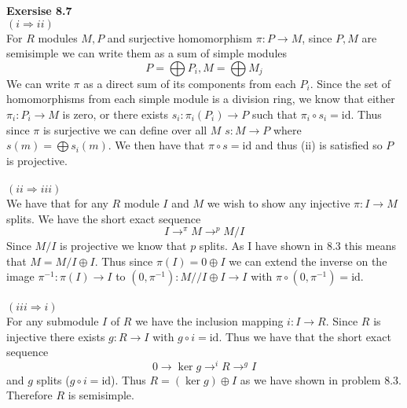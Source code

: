 \documentclass[12pt]{article}
\newenvironment{ques}[1]{\textbf{Exersise #1}\vspace{1 mm}\\ }{\bigskip}
\theoremstyle{definition}
\newcommand{\id}{\text{id}}
\begin{document}
\begin{ques}{8.7}
	$(i \Rightarrow ii)$\\
	For $R$ modules $M, P$ and surjective
	homomorphism $\pi: P \to M$, since $P, M$ are semisimple we can write them
	as a sum of simple modules 
	$$P = \bigoplus P_i, M = \bigoplus M_j$$
	We can write $\pi$ as a direct sum of its components from each $P_i$. Since
	the set of homomorphisms from each simple module is a division ring, we
	know that either $\pi_i: P_i \to M$ is zero, or there exists $s_i: \pi_i(P_i)
	\to P$ such that $\pi_i \circ s_i = \id$. Thus since $\pi$ is surjective we
	can define over all $M$ $s:M \to P$ where $s(m) = \bigoplus s_i(m)$. We
	then have that $\pi \circ s = \id$ and thus (ii) is satisfied so $P$ is
	projective. \\
	\\
	$(ii \Rightarrow iii)$\\
	We have that for any $R$ module $I$ and $M$ we wish to show any injective
	$\pi :I \to M$ splits. We have the short exact sequence
	$$I \to^{\pi} M \to^{p} M/I$$
	Since $M/I$ is projective we know that $p$ splits. As I have shown in 8.3
	this means that $M = M/I \oplus I$. Thus since $\pi(I) = 0 \oplus I$ we can
	extend the inverse on the image
	$\pi^{-1}: \pi(I) \to I$ to $(0, \pi^{-1}): M//I \oplus I \to I$ with $\pi
	\circ (0, \pi^{-1}) = \id$.
	\\
	\\
	$(iii \Rightarrow i)$\\
	For any submodule $I$ of $R$ we have the inclusion mapping $i : I \to R$.
	Since $R$ is injective there exists $g:R \to I$ with $g \circ i = \id$.
	Thus we have that the short exact sequence 
	$$0 \to \ker g \to^i R \to^g I$$
	and $g$ splits ($g \circ i = \id$). Thus $R = (\ker g) \oplus I$ as we have
	shown in problem 8.3. Therefore $R$ is semisimple.

\end{ques}
\end{document}
